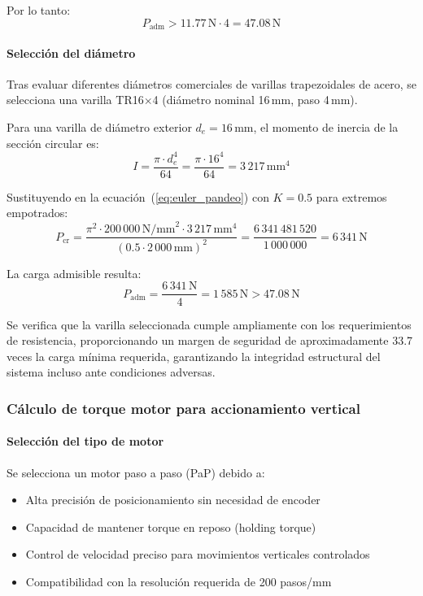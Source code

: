 Por lo tanto:
\[P_{\text{adm}} > 11.77\,\text{N} \cdot 4 = 47.08\,\text{N}\]

\paragraph{Selección del diámetro}
Tras evaluar diferentes diámetros comerciales de varillas trapezoidales de acero, se selecciona una varilla TR16$\times$4 (diámetro nominal 16\,mm, paso 4\,mm).

Para una varilla de diámetro exterior $d_e = 16$\,mm, el momento de inercia de la sección circular es:
\[I = \frac{\pi \cdot d_e^4}{64} = \frac{\pi \cdot 16^4}{64} = 3\,217\,\text{mm}^4\]

Sustituyendo en la ecuación~(\ref{eq:euler_pandeo}) con $K = 0.5$ para extremos empotrados:
\[P_{\text{cr}} = \frac{\pi^2 \cdot 200\,000\,\text{N/mm}^2 \cdot 3\,217\,\text{mm}^4}{(0.5 \cdot 2\,000\,\text{mm})^2} = \frac{6\,341\,481\,520}{1\,000\,000} = 6\,341\,\text{N}\]

La carga admisible resulta:
\[P_{\text{adm}} = \frac{6\,341\,\text{N}}{4} = 1\,585\,\text{N} > 47.08\,\text{N}\]

Se verifica que la varilla seleccionada cumple ampliamente con los requerimientos de resistencia, proporcionando un margen de seguridad de aproximadamente 33.7 veces la carga mínima requerida, garantizando la integridad estructural del sistema incluso ante condiciones adversas.

\subsubsection{Cálculo de torque motor para accionamiento vertical}

\paragraph{Selección del tipo de motor}
Se selecciona un motor paso a paso (PaP) debido a:
\begin{itemize}
    \item Alta precisión de posicionamiento sin necesidad de encoder
    \item Capacidad de mantener torque en reposo (holding torque)
    \item Control de velocidad preciso para movimientos verticales controlados
    \item Compatibilidad con la resolución requerida de 200 pasos/mm
\end{itemize}

